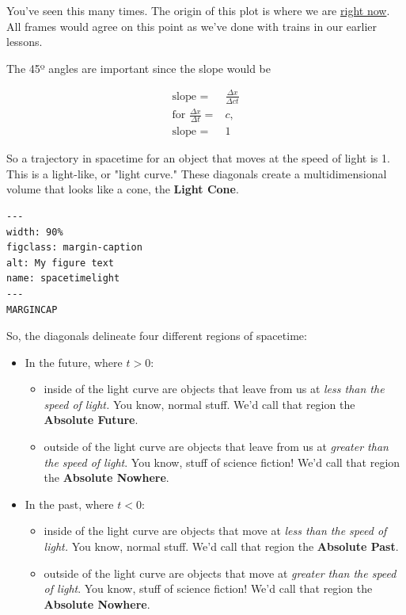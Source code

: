 \documentclass[
]{article}
\begin{document}
You've seen this many times. The origin of this plot is where we are
\underline{right now}. All frames would agree on this point as we've
done with trains in our earlier lessons.

The 45º angles are important since the slope would be

\begin{align*}
\text{slope } =& \frac{\Delta x}{\Delta ct} \\
\text{for } \frac{\Delta x}{\Delta t} =& c, \\
\text{slope } =& 1
\end{align*}

So a trajectory in spacetime for an object that moves at the speed of
light is 1. This is a light-like, or "light curve." These diagonals
create a multidimensional volume that looks like a cone, the
\textbf{Light Cone}.

\begin{verbatim}
---
width: 90%
figclass: margin-caption
alt: My figure text
name: spacetimelight
---
MARGINCAP
\end{verbatim}

So, the diagonals delineate four different regions of spacetime:

\begin{itemize}
\item
  In the future, where \(t>0\):

  \begin{itemize}
  \item
    inside of the light curve are objects that leave from us at
    \emph{less than the speed of light.} You know, normal stuff. We'd
    call that region the \textbf{Absolute Future}.
  \item
    outside of the light curve are objects that leave from us at
    \emph{greater than the speed of light}. You know, stuff of science
    fiction! We'd call that region the \textbf{Absolute Nowhere}.
  \end{itemize}
\item
  In the past, where \(t<0\):

  \begin{itemize}
  \item
    inside of the light curve are objects that move at \emph{less than
    the speed of light.} You know, normal stuff. We'd call that region
    the \textbf{Absolute Past}.
  \item
    outside of the light curve are objects that move at \emph{greater
    than the speed of light}. You know, stuff of science fiction! We'd
    call that region the \textbf{Absolute Nowhere}.
  \end{itemize}
\end{itemize}
\end{document}
